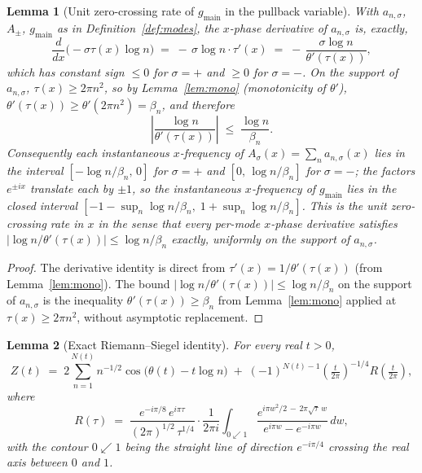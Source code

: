 \documentclass[11pt]{article}
\newtheorem{lemma}{Lemma}
\begin{document}
\begin{lemma}[Unit zero-crossing rate of $g_{\mathrm{main}}$ in the pullback variable]\label{lem:ucross}
With $a_{n,\sigma}$, $A_{\pm}$, $g_{\mathrm{main}}$ as in Definition~\ref{def:modes}, the $x$-phase derivative of $a_{n,\sigma}$ is, exactly,
\[
\frac{d}{dx}\bigl(-\sigma\tau(x)\log n\bigr) \;=\; -\,\sigma\log n\cdot\tau'(x) \;=\; -\,\frac{\sigma\log n}{\theta'(\tau(x))},
\]
which has constant sign $\le 0$ for $\sigma=+$ and $\ge 0$ for $\sigma=-$. On the support of $a_{n,\sigma}$, $\tau(x)\ge 2\pi n^{2}$, so by Lemma~\ref{lem:mono} (monotonicity of $\theta'$), $\theta'(\tau(x))\ge \theta'(2\pi n^{2}) = \beta_{n}$, and therefore
\[
\left|\frac{\log n}{\theta'(\tau(x))}\right| \;\le\; \frac{\log n}{\beta_{n}}.
\]
Consequently each instantaneous $x$-frequency of $A_{\sigma}(x) = \sum_{n} a_{n,\sigma}(x)$ lies in the interval $[-\log n/\beta_{n},\,0]$ for $\sigma=+$ and $[0,\,\log n/\beta_{n}]$ for $\sigma=-$; the factors $e^{\pm ix}$ translate each by $\pm 1$, so the instantaneous $x$-frequency of $g_{\mathrm{main}}$ lies in the closed interval $[-1 - \sup_{n}\log n/\beta_{n},\; 1 + \sup_{n}\log n/\beta_{n}]$. This is the \emph{unit zero-crossing rate} in $x$ in the sense that every per-mode $x$-phase derivative satisfies $|\log n/\theta'(\tau(x))|\le \log n/\beta_{n}$ exactly, uniformly on the support of $a_{n,\sigma}$.
\end{lemma}

\begin{proof}
The derivative identity is direct from $\tau'(x) = 1/\theta'(\tau(x))$ (from Lemma~\ref{lem:mono}). The bound $|\log n/\theta'(\tau(x))|\le \log n/\beta_{n}$ on the support of $a_{n,\sigma}$ is the inequality $\theta'(\tau(x))\ge\beta_{n}$ from Lemma~\ref{lem:mono} applied at $\tau(x)\ge 2\pi n^{2}$, without asymptotic replacement.
\end{proof}

\begin{lemma}[Exact Riemann--Siegel identity]\label{lem:rs}
For every real $t>0$,
\[
Z(t) \;=\; 2\sum_{n=1}^{N(t)} n^{-1/2}\cos\!\bigl(\theta(t)-t\log n\bigr) \;+\; (-1)^{N(t)-1}\!\left(\tfrac{t}{2\pi}\right)^{-1/4}\!R\!\left(\tfrac{t}{2\pi}\right),
\]
where
\[
R(\tau) \;=\; \frac{e^{-i\pi/8}\,e^{i\pi\tau}}{(2\pi)^{1/2}\,\tau^{1/4}}\cdot\frac{1}{2\pi i}\int_{0\swarrow 1}\frac{e^{i\pi w^{2}/2 \,-\, 2\pi\sqrt{\tau}\,w}}{e^{i\pi w}-e^{-i\pi w}}\,dw,
\]
with the contour $0\swarrow 1$ being the straight line of direction $e^{-i\pi/4}$ crossing the real axis between $0$ and $1$.
\end{lemma}
\end{document}
